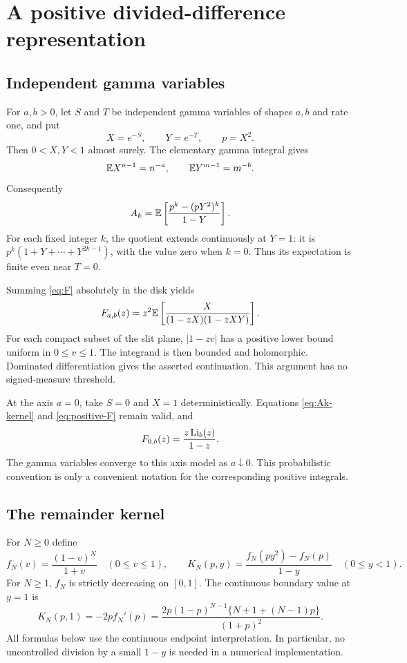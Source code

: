 \section{A positive divided-difference representation}
\label{sec:kernel}
\subsection{Independent gamma variables}
For $a,b>0$, let $S$ and $T$ be independent gamma variables of shapes $a,b$ and rate one, and put
\[
 X=e^{-S},\qquad Y=e^{-T},\qquad p=X^2.
\]
Then $0<X,Y<1$ almost surely. The elementary gamma integral gives
\begin{equation}\label{eq:moments}
 \mathbb E X^{n-1}=n^{-a},\qquad \mathbb E Y^{m-1}=m^{-b}.
\end{equation}
Consequently
\begin{equation}\label{eq:Ak-kernel}
 A_k=\mathbb E\left[\frac{p^k-(pY^2)^k}{1-Y}\right].
\end{equation}
For each fixed integer $k$, the quotient extends continuously at $Y=1$: it is $p^k(1+Y+\cdots+Y^{2k-1})$, with the value zero when $k=0$. Thus its expectation is finite even near $T=0$.

Summing \eqref{eq:F} absolutely in the disk yields
\begin{equation}\label{eq:positive-F}
 F_{a,b}(z)=z^2\mathbb E\left[\frac{X}{(1-zX)(1-zXY)}\right].
\end{equation}
For each compact subset of the slit plane, $|1-zv|$ has a positive lower bound uniform in $0\le v\le1$. The integrand is then bounded and holomorphic. Dominated differentiation gives the asserted continuation. This argument has no signed-measure threshold.

At the axis $a=0$, take $S=0$ and $X=1$ deterministically. Equations \eqref{eq:Ak-kernel} and \eqref{eq:positive-F} remain valid, and
\begin{equation}\label{eq:axis-F}
 F_{0,b}(z)=\frac{z\operatorname{Li}_b(z)}{1-z}.
\end{equation}
The gamma variables converge to this axis model as $a\downarrow0$. This probabilistic convention is only a convenient notation for the corresponding positive integrals.

\subsection{The remainder kernel}
For $N\ge0$ define
\begin{equation}\label{eq:fN}
 f_N(v)=\frac{(1-v)^N}{1+v}\quad(0\le v\le1),
 \qquad
 K_N(p,y)=\frac{f_N(py^2)-f_N(p)}{1-y}\quad(0\le y<1).
\end{equation}
For $N\ge1$, $f_N$ is strictly decreasing on $[0,1]$. The continuous boundary value at $y=1$ is
\begin{equation}\label{eq:kernel-boundary}
 K_N(p,1)=-2p f_N'(p)
 =\frac{2p(1-p)^{N-1}\{N+1+(N-1)p\}}{(1+p)^2}.
\end{equation}
All formulas below use the continuous endpoint interpretation. In particular, no uncontrolled division by a small $1-y$ is needed in a numerical implementation.

